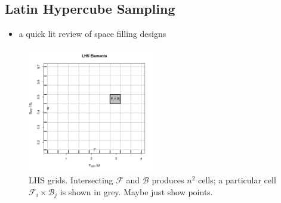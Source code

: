 \documentclass[12pt]{article}
\begin{document}
%
%
%
%


%
\subsection{Latin Hypercube Sampling \label{lhs}}

\begin{itemize}
	\item a quick lit review of space filling designs
\end{itemize}

%
\begin{figure}
\vspace{-2.9cm}
\includegraphics[width=0.49\textwidth]{../gpBias/designGrid.png}
\caption{ LHS grids. Intersecting $\mathcal{F}$ and $\mathcal{B}$ produces $n^2$
cells; a particular cell $\mathcal{F}_i\times\mathcal{B}_j$ is shown in grey. 
{\color{red} Maybe just show points.}
}
\end{figure}
\end{document}

